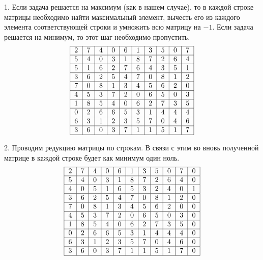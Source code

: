 \documentclass{article}
\begin{document}
1. Если задача решается на максимум (как в нашем случае), то в каждой строке матрицы необходимо найти максимальный элемент, вычесть его из каждого элемента соответствующей строки и умножить всю матрицу на $-1$. Если задача решается на минимум, то этот шаг необходимо пропустить.
\[
    \begin{tabular}{|c|c|c|c|c|c|c|c|c|c|}
        \hline
        2 & 7 & 4 & 0 & 6 & 1 & 3 & 5 & 0 & 7 \\
        \hline
        5 & 4 & 0 & 3 & 1 & 8 & 7 & 2 & 6 & 4 \\
        \hline
        5 & 1 & 6 & 2 & 7 & 6 & 4 & 3 & 5 & 1 \\
        \hline
        3 & 6 & 2 & 5 & 4 & 7 & 0 & 8 & 1 & 2 \\
        \hline
        7 & 0 & 8 & 1 & 3 & 4 & 5 & 6 & 2 & 0 \\
        \hline
        4 & 5 & 3 & 7 & 2 & 0 & 6 & 5 & 0 & 3 \\
        \hline
        1 & 8 & 5 & 4 & 0 & 6 & 2 & 7 & 3 & 5 \\
        \hline
        0 & 2 & 6 & 6 & 5 & 3 & 1 & 4 & 4 & 4 \\
        \hline
        6 & 3 & 1 & 2 & 3 & 5 & 7 & 0 & 4 & 6 \\
        \hline
        3 & 6 & 0 & 3 & 7 & 1 & 1 & 5 & 1 & 7 \\
        \hline
    \end{tabular}
\]

2. Проводим редукцию матрицы по строкам. В связи с этим во вновь полученной матрице в каждой строке будет как минимум один ноль.
\[
    \begin{tabular}{|c|c|c|c|c|c|c|c|c|c|c|}
        \hline
        2 & 7 & 4 & 0 & 6 & 1 & 3 & 5 & 0 & 7 & 0 \\
        \hline
        5 & 4 & 0 & 3 & 1 & 8 & 7 & 2 & 6 & 4 & 0 \\
        \hline
        4 & 0 & 5 & 1 & 6 & 5 & 3 & 2 & 4 & 0 & 1 \\
        \hline
        3 & 6 & 2 & 5 & 4 & 7 & 0 & 8 & 1 & 2 & 0 \\
        \hline
        7 & 0 & 8 & 1 & 3 & 4 & 5 & 6 & 2 & 0 & 0 \\
        \hline
        4 & 5 & 3 & 7 & 2 & 0 & 6 & 5 & 0 & 3 & 0 \\
        \hline
        1 & 8 & 5 & 4 & 0 & 6 & 2 & 7 & 3 & 5 & 0 \\
        \hline
        0 & 2 & 6 & 6 & 5 & 3 & 1 & 4 & 4 & 4 & 0 \\
        \hline
        6 & 3 & 1 & 2 & 3 & 5 & 7 & 0 & 4 & 6 & 0 \\
        \hline
        3 & 6 & 0 & 3 & 7 & 1 & 1 & 5 & 1 & 7 & 0 \\
        \hline
    \end{tabular}
\]
\end{document}
